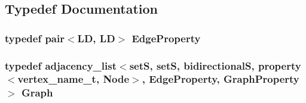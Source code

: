 \subsection{Typedef Documentation}
\subsubsection{\setlength{\rightskip}{0pt plus 5cm}typedef pair$<${\bf LD}, {\bf LD}$>$ {\bf EdgeProperty}}\label{bpgraph_8h_62157ab7e0bf5e07a66fa4d64f2e6f4f}


\subsubsection{\setlength{\rightskip}{0pt plus 5cm}typedef adjacency\_\-list$<$setS, setS, bidirectionalS, property$<$vertex\_\-name\_\-t, {\bf Node}$>$, {\bf EdgeProperty}, {\bf GraphProperty}$>$ {\bf Graph}}\label{bpgraph_8h_326580b7bdaefba82c2e9a566c074695}


